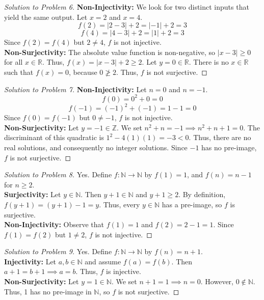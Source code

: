 \documentclass[11pt, letterpaper]{article}
\theoremstyle{definition}
\theoremstyle{remark}
\newcommand{\R}{\mathbb{R}}
\newcommand{\N}{\mathbb{N}}
\newcommand{\Z}{\mathbb{Z}}
\begin{document}
\begin{proof}[Solution to Problem 6]
\textbf{Non-Injectivity:} We look for two distinct inputs that yield the same output. Let $x = 2$ and $x = 4$. 
\[ f(2) = |2 - 3| + 2 = |-1| + 2 = 3 \]
\[ f(4) = |4 - 3| + 2 = |1| + 2 = 3 \]
Since $f(2) = f(4)$ but $2 \neq 4$, $f$ is not injective. \\
\textbf{Non-Surjectivity:} The absolute value function is non-negative, so $|x - 3| \ge 0$ for all $x \in \R$. Thus, $f(x) = |x - 3| + 2 \ge 2$. Let $y = 0 \in \R$. There is no $x \in \R$ such that $f(x) = 0$, because $0 \not\ge 2$. Thus, $f$ is not surjective.
\end{proof}

\begin{proof}[Solution to Problem 7]
\textbf{Non-Injectivity:} Let $n = 0$ and $n = -1$. 
\[ f(0) = 0^2 + 0 = 0 \]
\[ f(-1) = (-1)^2 + (-1) = 1 - 1 = 0 \]
Since $f(0) = f(-1)$ but $0 \neq -1$, $f$ is not injective. \\
\textbf{Non-Surjectivity:} Let $y = -1 \in \Z$. We set $n^2 + n = -1 \implies n^2 + n + 1 = 0$. The discriminant of this quadratic is $1^2 - 4(1)(1) = -3 < 0$. Thus, there are no real solutions, and consequently no integer solutions. Since $-1$ has no pre-image, $f$ is not surjective.
\end{proof}

\begin{proof}[Solution to Problem 8]
Yes. Define $f : \N \to \N$ by $f(1) = 1$, and $f(n) = n - 1$ for $n \ge 2$. \\
\textbf{Surjectivity:} Let $y \in \N$. Then $y + 1 \in \N$ and $y + 1 \ge 2$. By definition, $f(y + 1) = (y + 1) - 1 = y$. Thus, every $y \in \N$ has a pre-image, so $f$ is surjective. \\
\textbf{Non-Injectivity:} Observe that $f(1) = 1$ and $f(2) = 2 - 1 = 1$. Since $f(1) = f(2)$ but $1 \neq 2$, $f$ is not injective.
\end{proof}

\begin{proof}[Solution to Problem 9]
Yes. Define $f : \N \to \N$ by $f(n) = n + 1$. \\
\textbf{Injectivity:} Let $a, b \in \N$ and assume $f(a) = f(b)$. Then $a + 1 = b + 1 \implies a = b$. Thus, $f$ is injective. \\
\textbf{Non-Surjectivity:} Let $y = 1 \in \N$. We set $n + 1 = 1 \implies n = 0$. However, $0 \notin \N$. Thus, 1 has no pre-image in $\N$, so $f$ is not surjective.
\end{proof}
\end{document}
